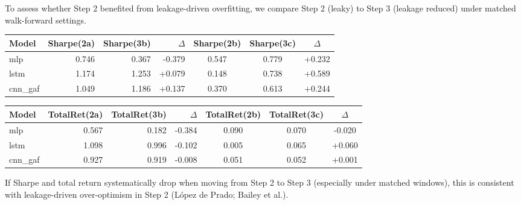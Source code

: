 To assess whether Step 2 benefited from leakage-driven overfitting, we compare Step 2 (leaky) to Step 3 (leakage reduced) under matched walk-forward settings.
\begin{table}[H]
\centering
\small
\begin{tabular}{lrrrccc}
\toprule
Model & Sharpe(2a) & Sharpe(3b) & $\Delta$ & Sharpe(2b) & Sharpe(3c) & $\Delta$\\
\midrule
mlp & 0.746 & 0.367 & -0.379 & 0.547 & 0.779 & +0.232 \\
lstm & 1.174 & 1.253 & +0.079 & 0.148 & 0.738 & +0.589 \\
cnn\_gaf & 1.049 & 1.186 & +0.137 & 0.370 & 0.613 & +0.244 \\
\bottomrule
\end{tabular}
\end{table}
\begin{table}[H]
\centering
\small
\begin{tabular}{lrrrccc}
\toprule
Model & TotalRet(2a) & TotalRet(3b) & $\Delta$ & TotalRet(2b) & TotalRet(3c) & $\Delta$\\
\midrule
mlp & 0.567 & 0.182 & -0.384 & 0.090 & 0.070 & -0.020 \\
lstm & 1.098 & 0.996 & -0.102 & 0.005 & 0.065 & +0.060 \\
cnn\_gaf & 0.927 & 0.919 & -0.008 & 0.051 & 0.052 & +0.001 \\
\bottomrule
\end{tabular}
\end{table}
If Sharpe and total return systematically drop when moving from Step 2 to Step 3 (especially under matched windows), this is consistent with leakage-driven over-optimism in Step 2 (L\'opez de Prado; Bailey et al.).
